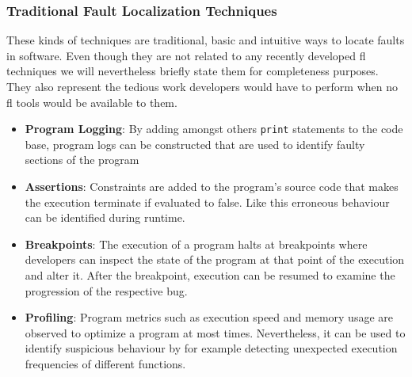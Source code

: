 \documentclass[
fancyheadings, %
%
%
]{stsreprt}
\begin{document}
\subsubsection{Traditional Fault Localization Techniques}
These kinds of techniques are traditional, basic and intuitive ways to locate faults in software. Even though they are not related to any recently developed \acrshort{fl} techniques we will nevertheless briefly state them for completeness purposes. They also represent the tedious work developers would have to perform when no \acrshort{fl} tools would be available to them. 
\begin{itemize}
    \item \textbf{Program Logging}: By adding amongst others \texttt{print} statements to the code base, program logs can be constructed that are used to identify faulty sections of the program 
    \item \textbf{Assertions}: Constraints are added to the program's source code that makes the execution terminate if evaluated to false. 
    Like this erroneous behaviour can be identified during runtime.
    \item \textbf{Breakpoints}: The execution of a program halts at breakpoints where developers can inspect the state of the program at that point of the execution and alter it. 
    After the breakpoint, execution can be resumed to examine the progression of the respective bug.
    \item \textbf{Profiling}: Program metrics such as execution speed and memory usage are observed to optimize a program at most times. 
    Nevertheless, it can be used to identify suspicious behaviour by for example detecting unexpected execution frequencies of different functions. 
\end{itemize}
\end{document}
